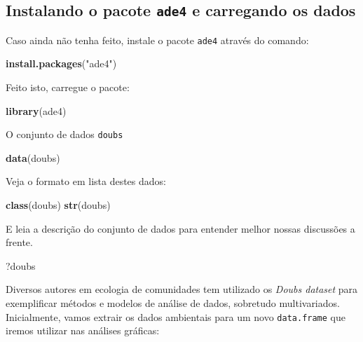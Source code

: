 \documentclass[
]{book}
\newenvironment{Shaded}{\begin{snugshade}}{\end{snugshade}}
\newcommand{\KeywordTok}[1]{\textcolor[rgb]{0.13,0.29,0.53}{\textbf{#1}}}
\newcommand{\NormalTok}[1]{#1}
\newcommand{\StringTok}[1]{\textcolor[rgb]{0.31,0.60,0.02}{#1}}
\begin{document}
\hypertarget{instalando-o-pacote-ade4-e-carregando-os-dados}{%
\subsection{\texorpdfstring{Instalando o pacote \texttt{ade4} e carregando os dados}{Instalando o pacote ade4 e carregando os dados}}\label{instalando-o-pacote-ade4-e-carregando-os-dados}}

Caso ainda não tenha feito, instale o pacote \texttt{ade4} através do comando:

\begin{Shaded}
\begin{Highlighting}[]
\KeywordTok{install.packages}\NormalTok{(}\StringTok{"ade4"}\NormalTok{)}
\end{Highlighting}
\end{Shaded}

Feito isto, carregue o pacote:

\begin{Shaded}
\begin{Highlighting}[]
\KeywordTok{library}\NormalTok{(ade4)}
\end{Highlighting}
\end{Shaded}

O conjunto de dados \texttt{doubs}

\begin{Shaded}
\begin{Highlighting}[]
\KeywordTok{data}\NormalTok{(doubs)}
\end{Highlighting}
\end{Shaded}

Veja o formato em lista destes dados:

\begin{Shaded}
\begin{Highlighting}[]
\KeywordTok{class}\NormalTok{(doubs)}
\KeywordTok{str}\NormalTok{(doubs)}
\end{Highlighting}
\end{Shaded}

E leia a descrição do conjunto de dados para entender melhor nossas discussões a frente.

\begin{Shaded}
\begin{Highlighting}[]
\NormalTok{?doubs}
\end{Highlighting}
\end{Shaded}

Diversos autores em ecologia de comunidades tem utilizado os \emph{Doubs dataset} para exemplificar métodos e modelos de análise de dados, sobretudo multivariados. Inicialmente, vamos extrair os dados ambientais para um novo \texttt{data.frame} que iremos utilizar nas análises gráficas:
\end{document}
